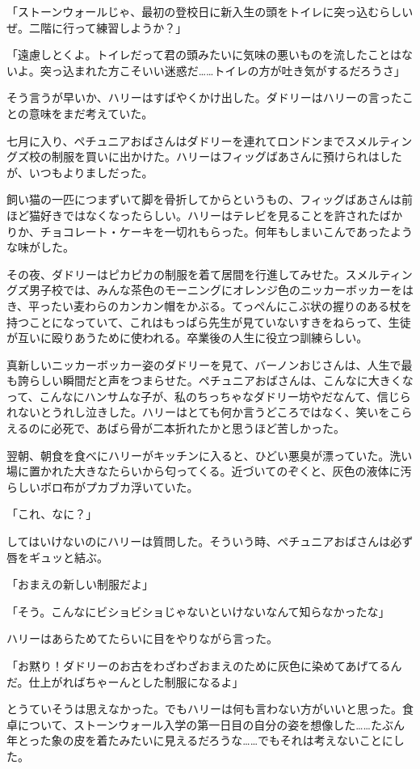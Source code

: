 \documentclass[10pt,a4paper]{article}
\begin{document}
\begin{CJK}{UTF8}{min}
「ストーンウォールじゃ、最初の登校日に新入生の頭をトイレに突っ込むらしいぜ。二階に行って練習しようか？」

「遠慮しとくよ。トイレだって君の頭みたいに気味の悪いものを流したことはないよ。突っ込まれた方こそいい迷惑だ……トイレの方が吐き気がするだろうさ」

そう言うが早いか、ハリーはすばやくかけ出した。ダドリーはハリーの言ったことの意味をまだ考えていた。

七月に入り、ペチュニアおばさんはダドリーを連れてロンドンまでスメルティングズ校の制服を買いに出かけた。ハリーはフィッグばあさんに預けられはしたが、いつもよりましだった。

飼い猫の一匹につまずいて脚を骨折してからというもの、フィッグばあさんは前ほど猫好きではなくなったらしい。ハリーはテレビを見ることを許されたばかりか、チョコレート・ケーキを一切れもらった。何年もしまいこんであったような味がした。

その夜、ダドリーはピカピカの制服を着て居間を行進してみせた。スメルティングズ男子校では、みんな茶色のモーニングにオレンジ色のニッカーボッカーをはき、平ったい麦わらのカンカン帽をかぶる。てっぺんにこぶ状の握りのある杖を持つことになっていて、これはもっぱら先生が見ていないすきをねらって、生徒が互いに殴りあうために使われる。卒業後の人生に役立つ訓練らしい。

真新しいニッカーボッカー姿のダドリーを見て、バーノンおじさんは、人生で最も誇らしい瞬間だと声をつまらせた。ペチュニアおばさんは、こんなに大きくなって、こんなにハンサムな子が、私のちっちゃなダドリー坊やだなんて、信じられないとうれし泣きした。ハリーはとても何か言うどころではなく、笑いをこらえるのに必死で、あばら骨が二本折れたかと思うほど苦しかった。

翌朝、朝食を食べにハリーがキッチンに入ると、ひどい悪臭が漂っていた。洗い場に置かれた大きなたらいから匂ってくる。近づいてのぞくと、灰色の液体に汚らしいボロ布がプカブカ浮いていた。

「これ、なに？」

してはいけないのにハリーは質問した。そういう時、ペチュニアおばさんは必ず唇をギュッと結ぶ。

「おまえの新しい制服だよ」

「そう。こんなにビショビショじゃないといけないなんて知らなかったな」

ハリーはあらためてたらいに目をやりながら言った。

「お黙り！ダドリーのお古をわざわざおまえのために灰色に染めてあげてるんだ。仕上がればちゃーんとした制服になるよ」

とうていそうは思えなかった。でもハリーは何も言わない方がいいと思った。食卓について、ストーンウォール入学の第一日目の自分の姿を想像した……たぶん年とった象の皮を着たみたいに見えるだろうな……でもそれは考えないことにした。


\end{CJK}
\end{document}
